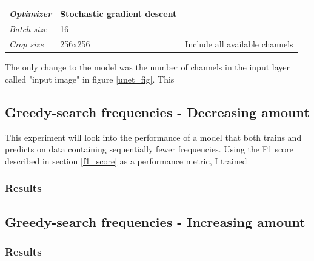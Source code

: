 \begin{table}[H]
\begin{tabular}{lll}
        \multicolumn{1}{|l|}{\textit{Optimizer}}                & \multicolumn{1}{l|}{Stochastic gradient descent}           & \multicolumn{1}{l|}{}                                                                                   \\ \hline
        \multicolumn{1}{|l|}{\textit{Batch size}}               & \multicolumn{1}{l|}{16}                                    & \multicolumn{1}{l|}{}                                                                                   \\ \hline
        \multicolumn{1}{|l|}{\textit{Crop size}}                & \multicolumn{1}{l|}{256x256}                               & \multicolumn{1}{l|}{Include all available channels}                                                     \\ \hline
        \end{tabular}
        \end{table}
        
        The only change to the model was the number of channels in the input layer called "input image" in figure \ref{unet_fig}. This 
        
    
    \subsection{Greedy-search frequencies - Decreasing amount}
        This experiment will look into the performance of a model that both trains and predicts on data containing sequentially fewer frequencies. Using the F1 score described in section \ref{f1_score} as a performance metric,  I trained 
        
    \subsubsection{Results}
        
    \subsection{Greedy-search frequencies - Increasing amount}
    
    \subsubsection{Results}
        


